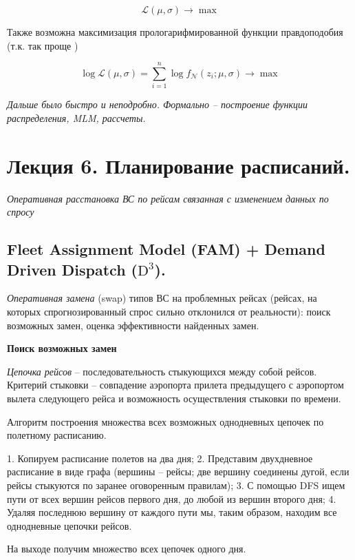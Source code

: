 \documentclass[reqno]{article}
\theoremstyle{definition}
\theoremstyle{definition}
\theoremstyle{definition}
\theoremstyle{definition}
\theoremstyle{definition}
\theoremstyle{definition}
\theoremstyle{definition}
\theoremstyle{definition}
\theoremstyle{definition}
\begin{document}
		$$\mathcal{L}(\mu, \sigma) \rightarrow \max$$
		
		Также возможна максимизация прологарифмированной функции правдоподобия (т.к. так проще )
		
		$$\log \mathcal{L}(\mu, \sigma) = \sum^n_{i = 1} \log f_\mathcal{N}(z_i; \mu, \sigma) \rightarrow \max$$
		
		\textit{Дальше было быстро и неподробно. Формально -- построение функции распределения, MLM, рассчеты.}
		
		
		
		
		\newpage
		\section{Лекция 6. Планирование расписаний.}
		
		\textit{Оперативная расстановка ВС по рейсам связанная с изменением данных по спросу}
		
		\subsection{Fleet Assignment Model (FAM) + Demand Driven Dispatch ($\text{D}^3$).}
		
		
		\textit{Оперативная замена} (swap) типов ВС на проблемных рейсах (рейсах, на которых спрогнозированный спрос сильно отклонился от реальности): поиск возможных замен, оценка эффективности найденных замен.
		
		\textbf{Поиск возможных замен}
		
		\textit{Цепочка рейсов} -- последовательность стыкующихся между собой рейсов. Критерий стыковки -- совпадение аэропорта прилета предыдущего с аэропортом вылета следующего рейса и возможность осуществления стыковки по времени.
		
		Алгоритм построения множества всех возможных однодневных цепочек по полетному расписанию.
		
		1. Копируем расписание полетов на два дня;
		2. Представим двухдневное расписание в виде графа (вершины -- рейсы; две вершину соединены дугой, если рейсы стыкуются по заранее оговоренным правилам);
		3. С помощью DFS ищем пути от всех вершин рейсов первого дня, до любой из вершин второго дня;
		4. Удаляя последнюю вершину от каждого пути мы, таким образом, находим все однодневные цепочки рейсов.
		
		На выходе получим множество всех цепочек одного дня.
		
		
\end{document}
